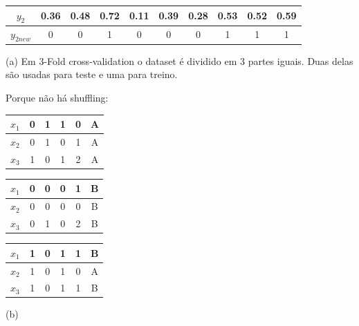 \documentclass[a4paper,12pt]{article} %
\begin{document}
\begin{enumerate}
\begin{itemize}
\end{itemize}

\begin{table}[H]
    \centering
    \begin{tabular}{c|ccccccccc}
    $y_2$     & 0.36 & 0.48 & 0.72 & 0.11 & 0.39 & 0.28 & 0.53 & 0.52 & 0.59 \\ \hline
    $y_{2 new}$ & 0    & 0    & 1    & 0    & 0    & 0    & 1    & 1    & 1   
    \end{tabular}
\end{table}

(a)
Em 3-Fold cross-validation o dataset é dividido em 3 partes iguais. Duas delas são usadas para teste e uma para treino.

Porque não há shuffling:

\begin{table}[H]
    \begin{minipage}[b]{0.3\linewidth}
    \centering
    \begin{tabular}{cccccc}
        $x_1$ & 0 & 1 & 1 & 0 & A \\ \hline
        $x_2$ & 0 & 1 & 0 & 1 & A \\ \hline
        $x_3$ & 1 & 0 & 1 & 2 & A
    \end{tabular}
    \end{minipage}
    \hfill
    \begin{minipage}[b]{0.3\linewidth}
    \centering
    \begin{tabular}{cccccc}
        $x_1$ & 0 & 0 & 0 & 1 & B \\ \hline
        $x_2$ & 0 & 0 & 0 & 0 & B \\ \hline
        $x_3$ & 0 & 1 & 0 & 2 & B
    \end{tabular}
    \end{minipage}
    \hfill
    \begin{minipage}[b]{0.3\linewidth}
    \centering
    \begin{tabular}{cccccc}
        $x_1$ & 1 & 0 & 1 & 1 & B \\ \hline
        $x_2$ & 1 & 0 & 1 & 0 & A \\ \hline
        $x_3$ & 1 & 0 & 1 & 1 & B
    \end{tabular}
    \end{minipage}
    \hfill

\end{table}

(b)


\end{enumerate}
\end{document}
